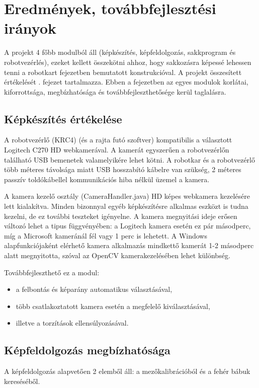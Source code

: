 \documentclass[../documentation.tex]{subfiles}
\begin{document}
\section{Eredmények, továbbfejlesztési irányok} \label{sec:results}
A projekt 4 főbb modulból áll (képkészítés, képfeldolgozás, sakkprogram és robotvezérlés), ezeket kellett összekötni ahhoz, hogy sakkozásra képessé lehessen tenni a robotkart  fejezetben bemutatott konstrukcióval. A projekt összesített értékelését . fejezet tartalmazza. Ebben a fejezetben az egyes modulok korlátai, kiforrottsága, megbízhatósága és továbbfejleszthetősége kerül taglalásra.

\subsection{Képkészítés értékelése}
A robotvezérlő (KRC4) (és a rajta futó szoftver) kompatibilis a választott Logitech C270 HD webkamerával. A kamerát egyszerűen a robotvezérlőn található USB bemenetek valamelyikére lehet kötni. A robotkar és a robotvezérlő több méteres távolsága miatt USB hosszabító kábelre van szükség, 2 méteres passzív toldókábellel kommunikációs hiba nélkül üzemel a kamera.

A kamera kezelő osztály (CameraHandler.java) HD képes webkamera kezelésére lett kialakítva. Minden bizonnyal egyéb képkészítésre alkalmas eszközt is tudna kezelni, de ez további teszteket igényelne. A kamera megnyitási ideje erősen változó lehet a tipus függvényében: a Logitech kamera esetén ez pár másodperc, míg a Microsoft kameránál fél vagy 1 perc is lehetett. A Windows alapfunkciójaként elérhető kamera alkalmazás mindkettő kamerát 1-2 másodperc alatt megnyitotta, szóval az OpenCV kamerakezelésében lehet különbség.

Továbbfejleszthető ez a modul:
\begin{itemize}
	\item a felbontás és képarány automatikus választásával,
	\item több csatlakoztatott kamera esetén a megfelelő kiválasztásával,
	\item illetve a torzítások ellensúlyozásával.
\end{itemize}

\subsection{Képfeldolgozás megbízhatósága}
A képfeldolgozás alapvetően 2 elemből áll: a mezőkalibrációból és a fehér bábuk kereséséből.
\end{document}
